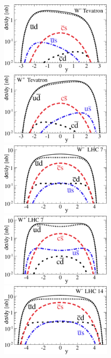 \documentclass[10pt]{beamer}
\begin{document}
\begin{frame}
\begin{columns}
	\begin{column}{0.5\textwidth}
 \begin{figure}[b!]
    \begin{center}
      \includegraphics[width=0.5\textwidth]{WmTEV.eps}
       \includegraphics[width=0.5\textwidth]{WpTEV.eps}\\
      \includegraphics[width=0.5\textwidth]{WmLHC7.eps}
       \includegraphics[width=0.5\textwidth]{WpLHC7.eps}\\
      \includegraphics[width=0.5\textwidth]{WmLHC14.eps}

\end{center}
\end{figure}
\end{column}
\end{columns}
\end{frame}
\end{document}
